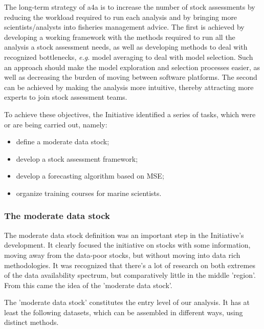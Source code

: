 \documentclass[a4paper,english,10pt]{article}\usepackage[]{graphicx}\usepackage[]{color}
\begin{document}
The long-term strategy of a4a is to increase the number of stock assessments by reducing the workload required to run each analysis and by bringing more scientists/analysts into fisheries management advice. The first is achieved by developing a working framework with the methods required to run all the analysis a stock assessment needs, as well as developing methods to deal with recognized bottlenecks, \emph{e.g.} model averaging to deal with model selection. Such an approach should make the model exploration and selection processes easier, as well as decreasing the burden of moving between software platforms. The second can be achieved by making the analysis more intuitive, thereby attracting more experts to join stock assessment teams.

To achieve these objectives, the Initiative identified a series of tasks, which were or are being carried out, namely:
\begin{itemize}
	\item define a moderate data stock;
	\item develop a stock assessment framework;
	\item develop a forecasting algorithm based on MSE;
	\item organize training courses for marine scientists.
\end{itemize}

\subsubsection{The moderate data stock}

The moderate data stock definition was an important step in the Initiative's development. It clearly focused the initiative on stocks with some information, moving away from the data-poor stocks, but without moving into data rich methodologies. It was recognized that there's a lot of research on both extremes of the data availability spectrum, but comparatively little in the middle 'region'. From this came the idea of the 'moderate data stock'. 

The 'moderate data stock' constitutes the entry level of our analysis. It has at least the following datasets, which can be assembled in different ways, using distinct methods.
 
\end{document}
